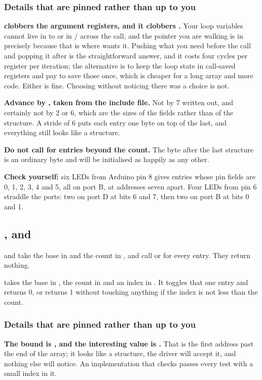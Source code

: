 \subsubsection{Details that are pinned rather than up to you}
\textbf{ clobbers the argument registers, and it clobbers .} Your loop
variables cannot live in  to  or in / across the call, and
the pointer you are walking is in  precisely because that is where 
wants it. Pushing what you need before the call and popping it after is the straightforward answer,
and it costs four cycles per register per iteration; the alternative is to keep the loop state in
call-saved registers and pay to save those once, which is cheaper for a long array and more code.
Either is fine. Choosing without noticing there was a choice is not.

\textbf{Advance by , taken from the include file.} Not by 7 written out, and
certainly not by 2 or 6, which are the sizes of the fields rather than of the structure. A stride of
6 puts each entry one byte on top of the last, and everything still looks like a structure.

\textbf{Do not call  for entries beyond the count.} The byte after the last structure
is an ordinary byte and will be initialised as happily as any other.

\textbf{Check yourself:} six LEDs from Arduino pin 8 gives entries whose pin fields are 0, 1, 2, 3,
4 and 5, all on port B, at addresses seven apart. Four LEDs from pin 6 straddle the ports: two on
port D at bits 6 and 7, then two on port B at bits 0 and 1.

\subsection{,  and }
\label{c4:sec:walks}
\textbf{} and \textbf{} take the base in
 and the count in , and call  or  for every
entry. They return nothing.

\textbf{} takes the base in , the count in  and
an index in . It toggles that one entry and returns 0, or returns 1 without touching
anything if the index is not less than the count.

\subsubsection{Details that are pinned rather than up to you}
\textbf{The bound is , and the interesting value is .}
That is the first address past the end of the array; it looks like a structure, the driver will
accept it, and nothing else will notice. An implementation that checks  passes
every test with a small index in it.

